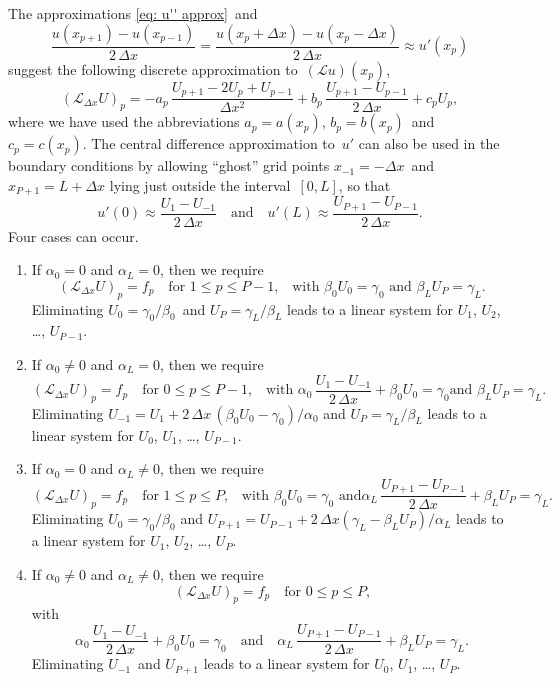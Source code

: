 The approximations \eqref{eq: u'' approx}~and
\[
\frac{u(x_{p+1})-u(x_{p-1})}{2\,\Delta x}
	=\frac{u(x_p+\Delta x)-u(x_p-\Delta x)}{2\,\Delta x}
	\approx u'(x_p)
\]
suggest the following discrete approximation to~$(\mathcal{L}u)(x_p)$, 
\begin{equation}\label{eq: Lu Delta x}
(\mathcal{L}_{\Delta x}U)_p=
-a_p\,\frac{U_{p+1}-2U_p+U_{p-1}}{\Delta x^2}
	+b_p\,\frac{U_{p+1}-U_{p-1}}{2\,\Delta x}+c_pU_p,
\end{equation}
where we have used the abbreviations $a_p=a(x_p)$, $b_p=b(x_p)$~and 
$c_p=c(x_p)$.  The central difference approximation to~$u'$ can also be used 
in the boundary conditions by allowing ``ghost'' grid points $x_{-1}=-\Delta 
x$~and $x_{P+1}=L+\Delta x$ lying just outside the interval~$[0,L]$, so that
\begin{equation}\label{eq: bc ghost points}
u'(0)\approx\frac{U_1-U_{-1}}{2\,\Delta x}
\quad\text{and}\quad
u'(L)\approx\frac{U_{P+1}-U_{P-1}}{2\,\Delta x}.
\end{equation}
Four cases can occur.
\begin{enumerate}
\item If $\alpha_0=0$ and $\alpha_L=0$, then we require
\[
(\mathcal{L}_{\Delta x}U)_p=f_p\quad\text{for $1\le p\le P-1$,}\quad
\text{with $\beta_0U_0=\gamma_0$ and $\beta_LU_P=\gamma_L$.}
\]
Eliminating $U_0=\gamma_0/\beta_0$~and $U_P=\gamma_L/\beta_L$ leads to a linear 
system for $U_1$, $U_2$, \dots, $U_{P-1}$.
\item If $\alpha_0\ne0$ and $\alpha_L=0$, then we require
\[
(\mathcal{L}_{\Delta x}U)_p=f_p\quad\text{for $0\le p\le P-1$,}\quad
\text{with $\alpha_0\,\frac{U_1-U_{-1}}{2\,\Delta x}+\beta_0U_0=\gamma_0$
and $\beta_LU_P=\gamma_L$.}
\]
Eliminating $U_{-1}=U_1+2\,\Delta x\,(\beta_0U_0-\gamma_0)/\alpha_0$ and 
$U_P=\gamma_L/\beta_L$ leads to a linear system for $U_0$, $U_1$, \dots, 
$U_{P-1}$.
\item If $\alpha_0=0$ and $\alpha_L\ne0$, then we require
\[
(\mathcal{L}_{\Delta x}U)_p=f_p\quad\text{for $1\le p\le P$,}\quad
\text{with $\beta_0U_0=\gamma_0$ and
$\alpha_L\,\frac{U_{P+1}-U_{P-1}}{2\,\Delta x}+\beta_LU_P=\gamma_L$.}
\]
Eliminating $U_0=\gamma_0/\beta_0$ and
$U_{P+1}=U_{P-1}+2\,\Delta x(\gamma_L-\beta_LU_P)/\alpha_L$ leads to a linear 
system for $U_1$, $U_2$, \dots, $U_P$.
\item If $\alpha_0\ne0$ and $\alpha_L\ne0$, then we require
\[
(\mathcal{L}_{\Delta x}U)_p=f_p\quad\text{for $0\le p\le P$,}
\]
with
\[
\alpha_0\,\frac{U_1-U_{-1}}{2\,\Delta x}+\beta_0U_0=\gamma_0
\quad\text{and}\quad
\alpha_L\,\frac{U_{P+1}-U_{P-1}}{2\,\Delta x}+\beta_LU_P=\gamma_L.
\]
Eliminating $U_{-1}$~and $U_{P+1}$ leads to a linear system for
$U_0$, $U_1$, \dots, $U_P$.
\end{enumerate}

